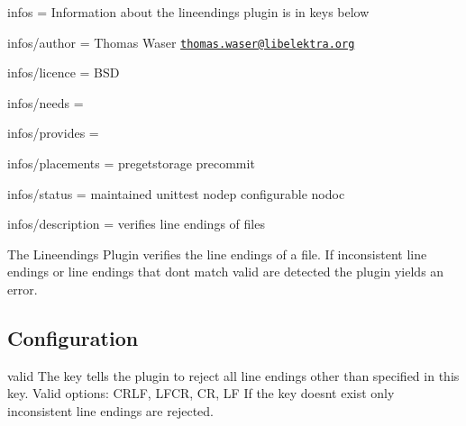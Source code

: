 
\begin{DoxyItemize}
\item infos = Information about the lineendings plugin is in keys below
\item infos/author = Thomas Waser \href{mailto:thomas.waser@libelektra.org}{\tt thomas.\+waser@libelektra.\+org}
\item infos/licence = B\+SD
\item infos/needs =
\item infos/provides =
\item infos/placements = pregetstorage precommit
\item infos/status = maintained unittest nodep configurable nodoc
\item infos/description = verifies line endings of files
\end{DoxyItemize}

The Lineendings Plugin verifies the line endings of a file. If inconsistent line endings or line endings that don\textquotesingle{}t match {\ttfamily valid} are detected the plugin yields an error.

\subsection*{Configuration}

{\ttfamily valid} The key tells the plugin to reject all line endings other than specified in this key. Valid options\+: C\+R\+LF, L\+F\+CR, CR, LF If the key doesn\textquotesingle{}t exist only inconsistent line endings are rejected. 